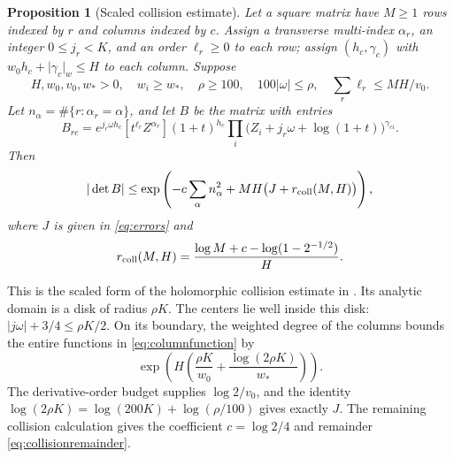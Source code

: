 \documentclass[11pt]{article}
\newtheorem{proposition}[theorem]{Proposition}
\theoremstyle{definition}
\theoremstyle{remark}
\theoremstyle{plain}
\newcommand{\wt}[1]{\lvert #1\rvert_w}
\begin{document}
\begin{proposition}[Scaled collision estimate]\label{prop:collision}
Let a square matrix have \(M\ge1\) rows indexed by \(r\) and columns
indexed by \(c\). Assign a transverse multi-index \(\alpha_r\), an
integer \(0\le j_r<K\), and an order \(\ell_r\ge0\) to each row;
assign \((h_c,\gamma_c)\) with
\(w_0h_c+\wt{\gamma_c}\le H\) to each column. Suppose
\[
 H,w_0,v_0,w_*>0,\quad w_i\ge w_*,\quad
 \rho\ge100,\quad 100|\omega|\le\rho,
 \quad \sum_r\ell_r\le MH/v_0.
\]
Let \(n_\alpha=\#\{r:\alpha_r=\alpha\}\), and let \(B\) be the
matrix with entries
\begin{equation}\label{eq:collisionmatrix}
 B_{rc}=e^{j_r\omega h_c}[t^{\ell_r}Z^{\alpha_r}]
 (1+t)^{h_c}\prod_i
       \bigl(Z_i+j_r\omega+\log(1+t)\bigr)^{\gamma_{ci}}.
\end{equation}
Then
\begin{equation}\label{eq:collisionbound}
 |\det B|\le
 \exp\left(-c\sum_\alpha n_\alpha^2+
                  MH\bigl(J+r_{\rm coll}(M,H)\bigr)\right),
\end{equation}
where \(J\) is given in \eqref{eq:errors} and
\begin{equation}\label{eq:collisionremainder}
 r_{\rm coll}(M,H)
  =\frac{\log M+c-\log(1-2^{-1/2})}{H}.
\end{equation}
\end{proposition}

This is the scaled form of the holomorphic collision estimate
in \cite{openai,rational}. Its analytic domain is a disk of radius \(\rho K\).
The centers lie well inside this disk:
\(\lvert j\omega\rvert+3/4\le\rho K/2\). On its boundary, the
weighted degree of the columns bounds the entire functions in
\eqref{eq:columnfunction} by
\[
 \exp\left(H\left(\frac{\rho K}{w_0}
                           +\frac{\log(2\rho K)}{w_*}\right)\right).
\]
The derivative-order budget supplies \(\log2/v_0\), and the identity
\(\log(2\rho K)=\log(200K)+\log(\rho/100)\) gives exactly \(J\).
The remaining collision calculation gives the coefficient \(c=\log2/4\)
and remainder \eqref{eq:collisionremainder}.
\end{document}
